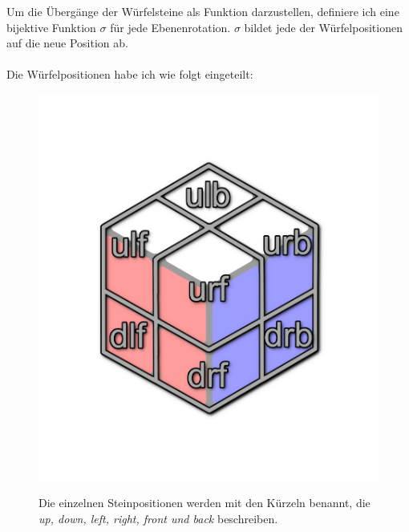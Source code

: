\documentclass[12pt,a4paper, usenames, dvipsnames]{article}
\begin{document}
Um die Übergänge der Würfelsteine als Funktion darzustellen, definiere ich eine bijektive Funktion $\sigma$ für jede Ebenenrotation. $\sigma$ bildet jede der Würfelpositionen auf die neue Position ab. \\
\\
Die Würfelpositionen habe ich wie folgt eingeteilt: \\
\begin{figure}[H]
\centering
\includegraphics[scale=0.15]{caged_positions.png} \\
\caption{Die einzelnen Steinpositionen werden mit den Kürzeln benannt, die \textit{up, down, left, right, front und back} beschreiben.}
\end{figure}
\end{document}
